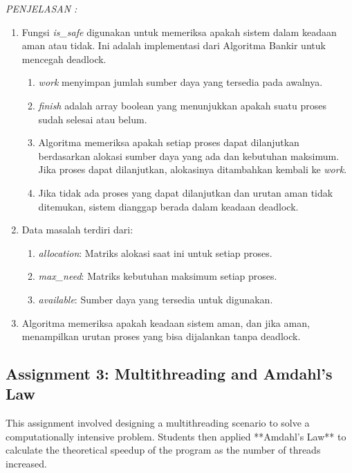 \documentclass[12pt]{article}
\begin{document}
\begin{enumerate}
\textit{PENJELASAN : }
\begin{enumerate}
    \item Fungsi \textit{is\_safe} digunakan untuk memeriksa apakah sistem dalam keadaan aman atau tidak. Ini adalah implementasi dari Algoritma Bankir untuk mencegah deadlock.
        \begin{enumerate}
            \item \textit{work} menyimpan jumlah sumber daya yang tersedia pada awalnya.
            \item \textit{finish} adalah array boolean yang menunjukkan apakah suatu proses sudah selesai atau belum.
            \item Algoritma memeriksa apakah setiap proses dapat dilanjutkan berdasarkan alokasi sumber daya yang ada dan kebutuhan maksimum. Jika proses dapat dilanjutkan, alokasinya ditambahkan kembali ke \textit{work}.
            \item Jika tidak ada proses yang dapat dilanjutkan dan urutan aman tidak ditemukan, sistem dianggap berada dalam keadaan deadlock.
        \end{enumerate}
    \item Data masalah terdiri dari:
        \begin{enumerate}
            \item \textit{allocation}: Matriks alokasi saat ini untuk setiap proses.
            \item \textit{max\_need}: Matriks kebutuhan maksimum setiap proses.
            \item \textit{available}: Sumber daya yang tersedia untuk digunakan.
        \end{enumerate}
    \item Algoritma memeriksa apakah keadaan sistem aman, dan jika aman, menampilkan urutan proses yang bisa dijalankan tanpa deadlock.
\end{enumerate}
\end{enumerate}


\subsection{Assignment 3: Multithreading and Amdahl's Law}
This assignment involved designing a multithreading scenario to solve a computationally intensive problem. Students then applied **Amdahl's Law** to calculate the theoretical speedup of the program as the number of threads increased.
\end{document}

